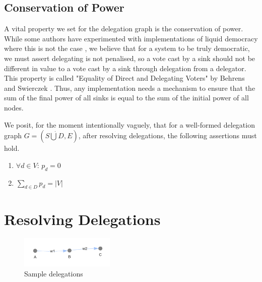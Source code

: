  \subsection{Conservation of Power}
 
 A vital property we set for the delegation graph is the conservation of power. While some authors have experimented with implementations of liquid democracy where this is not the case \cite{bersetcheGeneralizingLiquidDemocracy2022, boldiViscousDemocracySocial2011}, we believe that for a system to be truly democratic, we must assert delegating is not penalised, so a vote cast by a sink should not be different in value to a vote cast by a sink through delegation from a delegator. This property is called "Equality of Direct and Delegating Voters" by Behrens and Swierczek \cite{behrensPreferentialDelegationProblem2015}. Thus, any implementation needs a mechanism to ensure that the sum of the final power of all sinks is equal to the sum of the initial power of all nodes.
 
 We posit, for the moment intentionally vaguely, that for a well-formed delegation graph $G=(S \dot\bigcup D, E)$, after resolving delegations, the following assertions must hold.

\begin{enumerate}
\item $\forall d \in V$: $p_d = 0$ 
\item $\sum_{d \in D} p_d = |V|$
\end{enumerate}


\section{Resolving Delegations}

\begin{figure}[t]
	\centering
	\includegraphics[width=0.4\textwidth]{delegation_graph_sample}
	\caption{Sample delegations}
	\label{fig:sample_delegations}
\end{figure}

